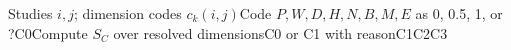 \begin{algorithm}[H]\caption{C0--C3 Cross-Paper Comparability Procedure}\label{alg:comparability}\begin{algorithmic}[1]\Require Studies $i,j$; dimension codes $c_k(i,j)$\State Code $P,W,D,H,N,B,M,E$ as 0, 0.5, 1, or ?\State \Return C0\EndIf\State Compute $S_C$ over resolved dimensions\State \Return C0 or C1 with reason\State \Return C1\State \Return C2\Else\State \Return C3\EndIf\end{algorithmic}\end{algorithm}